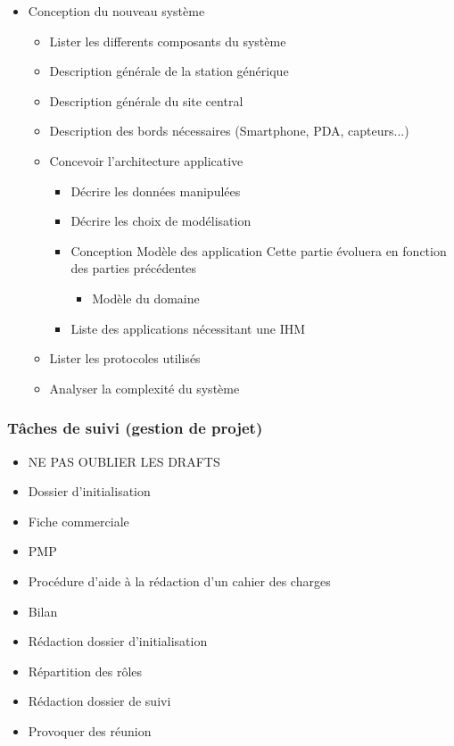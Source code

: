 \begin{itemize}
		\item Conception du nouveau système
		
			\begin{itemize}
				\item Lister les differents composants du système
				\item Description générale de la station générique
				\item Description générale du site central
				\item Description des bords nécessaires (Smartphone, PDA, capteurs...)
				\item Concevoir l'architecture applicative 
				\begin{itemize}  
					\item Décrire les données manipulées
					\item Décrire les choix de modélisation      
					\item Conception Modèle des application
					Cette partie évoluera en fonction des parties précédentes
					\begin{itemize}
					\item Modèle du domaine					
					\end{itemize}
					\item Liste des applications nécessitant une IHM          
				\end{itemize}          
				\item Lister les protocoles utilisés
				\item Analyser la complexité du système
			\end{itemize}       
				   
    \end{itemize}
    
\subsubsection {Tâches de suivi (gestion de projet)}
	\begin{itemize}
		\item NE PAS OUBLIER LES DRAFTS
		\item Dossier d'initialisation
		\item Fiche commerciale
		\item PMP
		\item Procédure d'aide à la rédaction d'un cahier des charges
		\item Bilan
		\item Rédaction dossier d'initialisation	
		\item Répartition des rôles		
		\item Rédaction dossier de suivi
		\item Provoquer des réunion
	
	\end{itemize}
	
